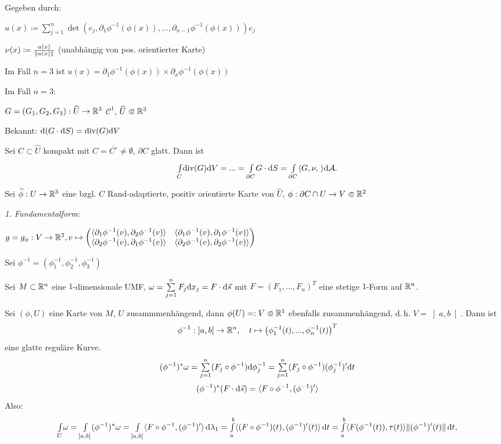 \documentclass{cheat-sheet}
\newcommand{\divergence}{\mathrm{div}} %
\theoremstyle{definition}
\newcommand{\Intdf}[2]{{\textstyle \int\limits_{#1}} #2} %
\newcommand{\scp}[2]{\langle #1 , #2 \rangle} %
\begin{document}
Gegeben durch:

$u(x) \coloneqq \sum_{j=1}^n \det(e_j, \partial_1 \phi^{-1}(\phi(x)), ..., \partial_{n {-} 1} \phi^{-1} (\phi(x))) e_j$

$\nu(x) \coloneqq \tfrac{u(x)}{\lVert u(x)\rVert}$ (unabhängig von pos. orientierter Karte)

Im Fall $n = 3$ ist $u(x) = \partial_1 \phi^{-1}(\phi(x)) \times \partial_x \phi^{-1}(\phi(x))$

Im Fall $n=3$:

$G = (G_1, G_2, G_3) : \widehat{U} \to \mathbb{R}^3$ $\mathcal{C}^1$, $\widehat{U} \opn \R^3$

Bekannt: $\d (G \cdot \d S) = \divergence (G) \d V$

\begin{satz}
  Sei $C \subset \widehat{U}$ kompakt mit $C = \overline{C^{\circ}} \not= \emptyset$, $\partial C$ glatt. Dann ist
  \[ \Intdf{C}{\divergence(G) \d V} = ... = \Intdf{\partial C}{G \cdot \d S} = \Int{\partial C}{}{\scp{G, \nu}}{\mathcal{A}}. \]
\end{satz}

Sei $\widehat{\phi} : U \to \mathbb{R}^3$ eine bzgl. $C$ Rand-adaptierte, positiv orientierte Karte von $\widehat{U}$, $\phi : \partial C \cap U \to V \opn \R^2$

\emph{1. Fundamentalform}:

$g = g_\phi : V \to \R^2, v \mapsto \begin{pmatrix} \scp{\partial_1 \phi^{-1}(v)}{\partial_2 \phi^{-1}(v)} & \scp{\partial_1 \phi^{-1}(v)}{\partial_1 \phi^{-1}(v)} \\ \scp{\partial_2 \phi^{-1}(v)}{\partial_1 \phi^{-1}(v)} & \scp{\partial_2 \phi^{-1}(v)}{\partial_2 \phi^{-1}(v)} \end{pmatrix}$

Sei $\phi^{-1} = (\phi_1^{-1}, \phi_2^{-1}, \phi_3^{-1})$



Sei $M \subset \mathbb{R}^n$ eine $1$-dimensionale UMF, $\omega = \sum_{j=1}^n F_j \d x_j = F \cdot \d \vec{s}$ mit $F = (F_1, ..., F_n)^T$ eine stetige $1$-Form auf $\mathbb{R}^n$.

Sei $(\phi, U)$ eine Karte von $M$, $U$ zusammmenhängend, dann $\phi(U) =: V \opn \R^1$ ebenfalls zusammenhängend, d.\,h. $V = \left] a, b \right[$. Dann ist
\[ \phi^{-1} : \left] a, b \right[ \to \mathbb{R}^n, \quad t \mapsto \left( \phi_1^{-1}(t), ..., \phi_n^{-1}(t) \right)^T \]
eine glatte reguläre Kurve.
\[ (\phi^{-1})^* \omega = \sum_{j=1}^n (F_j \circ \phi^{-1}) \d \phi_j^{-1} = \sum_{j=1}^n (F_j \circ \phi^{-1}) (\phi_j^{-1})' \d t \]
\[ (\phi^{-1})^* (F \cdot \mathrm{d} \vec{s}) = \langle F \circ \phi^{-1}, (\phi^{-1})' \rangle \]
Also:
\[ \Intdf{U}{\omega} = \Intdf{\left] a, b \right[}{(\phi^{-1})^* \omega} = \Int{\left] a, b \right[}{}{\langle F \circ \phi^{-1} , (\phi^{-1})' \rangle}{\lambda_1} = \Int{a}{b}{\langle (F \circ \phi^{-1})(t) , (\phi^{-1})'(t) \rangle}{t} = \Int{a}{b}{\langle F(\phi^{-1}(t)) , \tau(t) \rangle \norm{(\phi^{-1})'(t)}}{t}, \]
\end{document}
